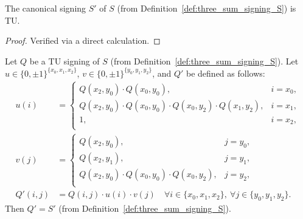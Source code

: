 \begin{lemma}\label{lem:three_sum_signing_S_TU}
    The canonical signing $S'$ of $S$ (from Definition~\ref{def:three_sum_signing_S}) is TU.
\end{lemma}

\begin{proof}
    Verified via a direct calculation.
\end{proof}

\begin{lemma}\label{lem:three_sum_re_signing_helper}
    Let $Q$ be a TU signing of $S$ (from Definition~\ref{def:three_sum_signing_S}). Let $u \in \{0, \pm 1\}^{\{x_{0}, x_{1}, x_{2}\}}$, $v \in \{0, \pm 1\}^{\{y_{0}, y_{1}, y_{2}\}}$, and $Q'$ be defined as follows:
    \begin{align*}
        u(i) &= \begin{cases}
            Q (x_{2}, y_{0}) \cdot Q (x_{0}, y_{0}), & i = x_{0}, \\
            Q (x_{2}, y_{0}) \cdot Q (x_{0}, y_{0}) \cdot Q (x_{0}, y_{2}) \cdot Q (x_{1}, y_{2}), & i = x_{1}, \\
            1, & i = x_{2}, \\
        \end{cases} \\
        v(j) &= \begin{cases}
            Q (x_{2}, y_{0}), & j = y_{0}, \\
            Q (x_{2}, y_{1}), & j = y_{1}, \\
            Q (x_{2}, y_{0}) \cdot Q (x_{0}, y_{0}) \cdot Q (x_{0}, y_{2}), & j = y_{2}, \\
        \end{cases} \\
        Q' (i, j) &= Q (i, j) \cdot u(i) \cdot v(j) \quad \forall i \in \{x_{0}, x_{1}, x_{2}\}, \ \forall j \in \{y_{0}, y_{1}, y_{2}\}.
    \end{align*}
    Then $Q' = S'$ (from Definition~\ref{def:three_sum_signing_S}).
\end{lemma}

